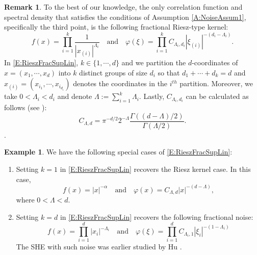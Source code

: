 \documentclass[a4paper,11pt]{article}
\numberwithin{equation}{section}
\theoremstyle{plain}
\theoremstyle{definition}
\newtheorem{remark}[theorem]{Remark}
\newtheorem{example}[theorem]{Example}
\numberwithin{NQ}{section}
\numberwithin{LQ}{section}
\numberwithin{ZQ}{section}
\begin{document}
\begin{remark}
  To the best of our knowledge, the only correlation function and spectral density that satisfies
  the conditions of Assumption \ref{A:NoiseAssum1}, specifically the third point, is the following
  fractional Riesz-type kernel:
	\begin{equation}\label{E:RieszFracSupLin}
		f(x) = \prod_{i=1}^k \frac{1}{|x_{(i)}|^{\Lambda_i}} \quad \text{and} \quad  \varphi(\xi) = \prod_{i=1}^k C_{\Lambda_i,d_i} |\xi_{(i)}|^{-(d_i-\Lambda_i)}.
	\end{equation}
  In \eqref{E:RieszFracSupLin}, $k \in \{1, \cdots , d\}$ and we partition the $d$-coordinates of
  $x=(x_1, \cdots, x_d)$ into $k$ distinct groups of size $d_i$ so that $d_1 + \cdots + d_k = d$ and
  $x_{(i)} = (x_{i_1} ,\cdots , x_{i_{d_i}})$ denotes the coordinates in the $i^{th}$ partition.
  Moreover, we take $0 < \Lambda_i < d_i$ and denote $\Lambda := \sum_{i=1}^k \Lambda_i$. Lastly,
  $C_{\Lambda_i, d_i}$ can be calculated as follows (see \cite[Example
  1.5]{chen.eisenberg:22:interpolating}):
  \[
     C_{\Lambda,d}     = \pi^{-d/2}2^{-\Lambda} \frac{\Gamma((d-\Lambda)/2)}{\Gamma(\Lambda/2)}.
  \].
\end{remark}

\begin{example}\label{Eg:NoiseEg}
	We have the following special cases of \eqref{E:RieszFracSupLin}:
	\begin{enumerate}
		\item Setting $k=1$ in \eqref{E:RieszFracSupLin} recovers the Riesz kernel case. In this case,
	\begin{equation}\label{E:RieszNoiseSupLin}
    f(x)       = |x|^{-\alpha} \quad \text{and} \quad
    \varphi(x) = C_{\Lambda,d}|x|^{-(d-\Lambda)},
	\end{equation}
	where $0 < \Lambda < d$.
	\item Setting $k=d$ in \eqref{E:RieszFracSupLin} recovers the following fractional noise:
	\begin{equation}\label{E:fracnoiseSupLin}
	f(x)         = \prod_{i=1}^d |x_i|^{-\Lambda_i} \quad \text{and} \quad
	\varphi(\xi) = \prod_{i=1}^d C_{\Lambda_i,1} |\xi_i|^{-(1-\Lambda_i)}
	\end{equation}
	The SHE with such noise was earlier studied by Hu
	\cite{hu:01:heat}.
	\end{enumerate}
\end{example}
\end{document}
